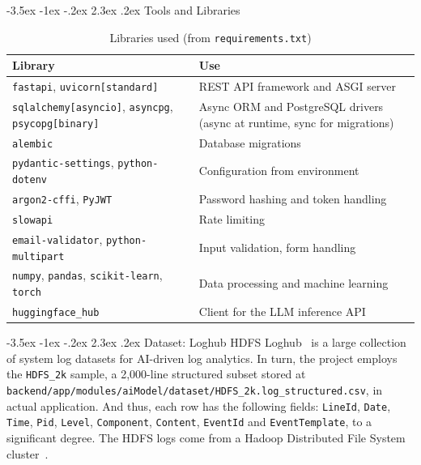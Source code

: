 \documentclass[12pt,a4paper]{report}
\makeatletter
\renewcommand{\arraystretch}{1.05}
\renewcommand\section{\@startsection {section}{1}{\z@}%
  {-3.5ex \@plus -1ex \@minus -.2ex}%
  {2.3ex \@plus .2ex}%
  {\normalfont\fontsize{17}{21}\selectfont\bfseries}}
\makeatother
\begin{document}
\section{Tools and Libraries}
\begin{table}[H]
\centering
\caption{Libraries used (from \texttt{requirements.txt})}
\label{tab:libs}
\small
\renewcommand{\arraystretch}{1.2}
\begin{tabularx}{\textwidth}{>{\raggedright\arraybackslash}p{4.2cm} >{\raggedright\arraybackslash}X}
\toprule
\textbf{Library} & \textbf{Use}\\
\midrule
\texttt{fastapi}, \texttt{uvicorn[standard]} & REST API framework and ASGI server\\
\texttt{sqlalchemy[asyncio]}, \texttt{asyncpg}, \texttt{psycopg[binary]} & Async ORM and PostgreSQL drivers (async at runtime, sync for migrations)\\
\texttt{alembic} & Database migrations\\
\texttt{pydantic-settings}, \texttt{python-dotenv} & Configuration from environment\\
\texttt{argon2-cffi}, \texttt{PyJWT} & Password hashing and token handling\\
\texttt{slowapi} & Rate limiting\\
\texttt{email-validator}, \texttt{python-multipart} & Input validation, form handling\\
\texttt{numpy}, \texttt{pandas}, \texttt{scikit-learn}, \texttt{torch} & Data processing and machine learning\\
\texttt{huggingface\_hub} & Client for the LLM inference API\\
\bottomrule
\end{tabularx}
\end{table}

\section{Dataset: Loghub HDFS}
Loghub~\cite{loghub} is a large collection of system log datasets for AI-driven log analytics. In turn, the project employs the \texttt{HDFS\_2k} sample, a 2{,}000-line structured subset stored at \texttt{backend/app/modules/aiModel/dataset/HDFS\_2k.log\_structured.csv}, in actual application. And thus, each row has the following fields: \texttt{LineId}, \texttt{Date}, \texttt{Time}, \texttt{Pid}, \texttt{Level}, \texttt{Component}, \texttt{Content}, \texttt{EventId} and \texttt{EventTemplate}, to a significant degree. The HDFS logs come from a Hadoop Distributed File System cluster~\cite{xu2009}.
\end{document}
